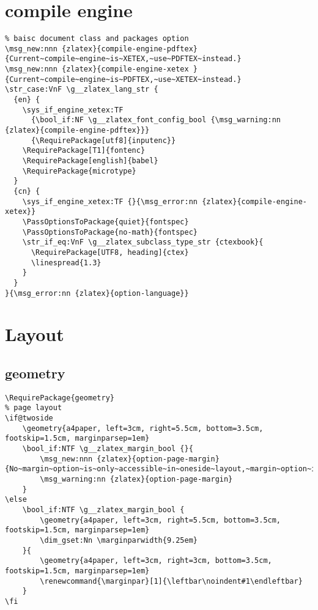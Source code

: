 \section{compile engine}
\begin{verbatim}
% baisc document class and packages option
\msg_new:nnn {zlatex}{compile-engine-pdftex}{Current~compile~engine~is~XETEX,~use~PDFTEX~instead.}
\msg_new:nnn {zlatex}{compile-engine-xetex }{Current~compile~engine~is~PDFTEX,~use~XETEX~instead.}
\str_case:VnF \g__zlatex_lang_str {
  {en} { 
    \sys_if_engine_xetex:TF 
      {\bool_if:NF \g__zlatex_font_config_bool {\msg_warning:nn {zlatex}{compile-engine-pdftex}}}
      {\RequirePackage[utf8]{inputenc}}
    \RequirePackage[T1]{fontenc}
    \RequirePackage[english]{babel}
    \RequirePackage{microtype}
  }
  {cn} {
    \sys_if_engine_xetex:TF {}{\msg_error:nn {zlatex}{compile-engine-xetex}}
    \PassOptionsToPackage{quiet}{fontspec}
    \PassOptionsToPackage{no-math}{fontspec}
    \str_if_eq:VnF \g__zlatex_subclass_type_str {ctexbook}{
      \RequirePackage[UTF8, heading]{ctex}
      \linespread{1.3}
    }
  }
}{\msg_error:nn {zlatex}{option-language}}   
\end{verbatim}

\section{Layout}
\subsection{geometry}
\begin{verbatim}
\RequirePackage{geometry}
% page layout 
\if@twoside 
    \geometry{a4paper, left=3cm, right=5.5cm, bottom=3.5cm, footskip=1.5cm, marginparsep=1em}
    \bool_if:NTF \g__zlatex_margin_bool {}{
        \msg_new:nnn {zlatex}{option-page-margin}{No~margin~option~is~only~accessible~in~oneside~layout,~margin~option~is~now~enabled~by~default.} 
        \msg_warning:nn {zlatex}{option-page-margin}
    }
\else 
    \bool_if:NTF \g__zlatex_margin_bool {
        \geometry{a4paper, left=3cm, right=5.5cm, bottom=3.5cm, footskip=1.5cm, marginparsep=1em}
        \dim_gset:Nn \marginparwidth{9.25em}
    }{
        \geometry{a4paper, left=3cm, right=3cm, bottom=3.5cm, footskip=1.5cm, marginparsep=1em}
        \renewcommand{\marginpar}[1]{\leftbar\noindent#1\endleftbar}
    }
\fi
\end{verbatim}

